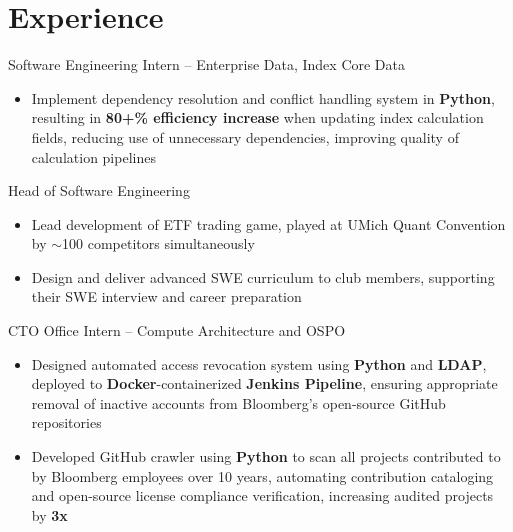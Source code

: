 \documentclass[letterpaper,11pt]{article}
\begin{document}
\section{Experience}
{Software Engineering Intern -- Enterprise Data, Index Core Data}{}
\begin{itemize}
    \item Implement dependency resolution and conflict handling system in
        \textbf{Python}, resulting in \textbf{80+\% efficiency increase} when
        updating index calculation fields, reducing use of unnecessary
        dependencies, improving quality of calculation pipelines
\end{itemize}
{Head of Software Engineering}{}
\begin{itemize}
    \item Lead development of ETF trading game, played at UMich Quant Convention
        by $\sim$100 competitors simultaneously
    \item Design and deliver advanced SWE curriculum to club members, supporting
        their SWE interview and career preparation
\end{itemize}
{CTO Office Intern -- Compute Architecture and OSPO}{}
\begin{itemize}
    \item Designed automated access revocation system using \textbf{Python} and
        \textbf{LDAP}, deployed to \textbf{Docker}-containerized
        \textbf{Jenkins Pipeline}, ensuring appropriate removal of inactive
        accounts from Bloomberg's open-source GitHub repositories
    \item Developed GitHub crawler using \textbf{Python} to scan all projects
        contributed to by Bloomberg employees over 10 years, automating
        contribution cataloging and open-source license compliance
        verification, increasing audited projects by \textbf{3x}
\end{itemize}
\end{document}
